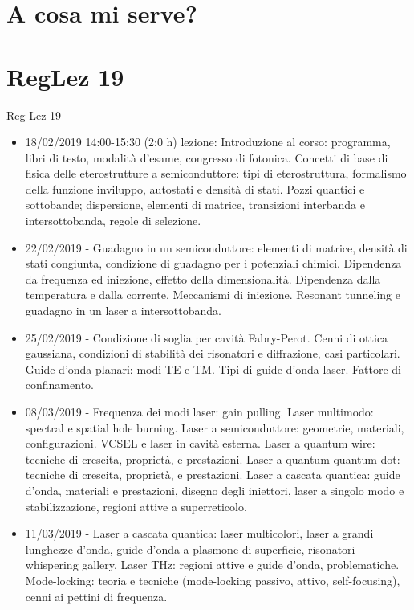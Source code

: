 \section{A cosa mi serve?}

\section{RegLez 19}
\begin{frame}[allowframebreaks]{Reg Lez 19}
\begin{itemize}
 \item 18/02/2019 14:00-15:30 (2:0 h) lezione: Introduzione al corso: programma, libri di testo, modalità d'esame, congresso di fotonica. Concetti di base di fisica delle eterostrutture a semiconduttore: tipi di eterostruttura, formalismo della funzione inviluppo, autostati e densità di stati. Pozzi quantici e sottobande; dispersione, elementi di matrice, transizioni interbanda e intersottobanda, regole di selezione.
    \item 22/02/2019 - Guadagno in un semiconduttore: elementi di matrice, densità di stati congiunta, condizione di guadagno per i potenziali chimici. Dipendenza da frequenza ed iniezione, effetto della dimensionalità. Dipendenza dalla temperatura e dalla corrente. Meccanismi di iniezione. Resonant tunneling e guadagno in un laser a intersottobanda.
    \item 25/02/2019 - Condizione di soglia per cavità Fabry-Perot. Cenni di ottica gaussiana, condizioni di stabilità dei risonatori e diffrazione, casi particolari. Guide d'onda planari: modi TE e TM. Tipi di guide d'onda laser. Fattore di confinamento.
    \item 08/03/2019 - Frequenza dei modi laser: gain pulling. Laser multimodo: spectral e spatial hole burning. Laser a semiconduttore: geometrie, materiali, configurazioni. VCSEL e laser in cavità esterna. Laser a quantum wire: tecniche di crescita, proprietà, e prestazioni. Laser a quantum quantum dot: tecniche di crescita, proprietà, e prestazioni. Laser a cascata quantica: guide d'onda, materiali e prestazioni, disegno degli iniettori, laser a singolo modo e stabilizzazione, regioni attive a superreticolo.
    \item 11/03/2019 - Laser a cascata quantica: laser multicolori, laser a grandi lunghezze d'onda, guide d'onda a plasmone di superficie, risonatori whispering gallery. Laser THz: regioni attive e guide d'onda, problematiche. Mode-locking: teoria e tecniche (mode-locking passivo, attivo, self-focusing), cenni ai pettini di frequenza.

\end{itemize}
\end{frame}
